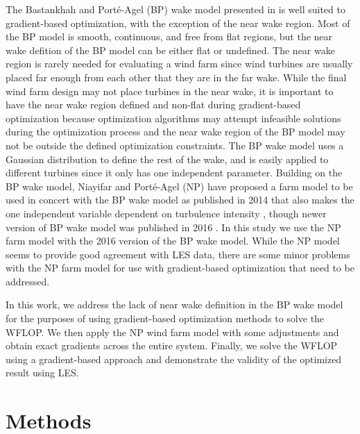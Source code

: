 \documentclass[conf]{new-aiaa}
\begin{document}
The Bastankhah and Port\'{e}-Agel (BP) wake model presented in \cite{bastankhah2014, bastankhah2016} is well suited to gradient-based optimization, with the exception of the near wake region. Most of the BP model is smooth, continuous, and free from flat regions, but the near wake defition of the BP model can be either flat or undefined. The near wake region is rarely needed for evaluating a wind farm since wind turbines are usually placed far enough from each other that they are in the far wake. While the final wind farm design may not place turbines in the near wake, it is important to have the near wake region defined and non-flat during gradient-based optimization because optimization algorithms may attempt infeasible solutions during the optimization process \cite{belegundu2011} and the near wake region of the BP model may not be outside the defined optimization constraints. The BP wake model uses a Gaussian distribution to define the rest of the wake, and is easily applied to different turbines since it only has one independent parameter. Building on the BP wake model, Niayifar and Port\'{e}-Agel (NP) have proposed a farm model \cite{niayifar2015, niayifar2016} to be used in concert with the BP wake model as published in 2014 that also makes the one independent variable dependent on turbulence intensity \cite{bastankhah2014}, though newer version of BP wake model was published in 2016 \cite{bastankhah2016}. In this study we use the NP farm model with the 2016 version of the BP wake model. While the NP model seems to provide good agreement with LES data, there are some minor problems with the NP farm model for use with gradient-based optimization that need to be addressed.

In this work, we address the lack of near wake definition in the BP wake model for the purposes of using gradient-based optimization methods to solve the WFLOP. We then apply the NP wind farm model with some adjustments and obtain exact gradients across the entire system. Finally, we solve the WFLOP using a gradient-based approach and demonstrate the validity of the optimized result using LES.

\section{Methods}
\end{document}
